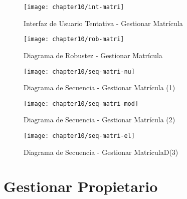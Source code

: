      \begin{figure}[H]
        \centering
        \texttt{[image: chapter10/int-matri]}
        \caption{Interfaz de Usuario Tentativa - Gestionar Matrícula}
        \label{fig:int-matri}
    \end{figure}
    
\begin{landscape}
    \begin{figure}[H]
        \centering
        \texttt{[image: chapter10/rob-matri]}
        \caption{Diagrama de Robustez - Gestionar Matrícula}
        \label{fig:rob-matri}
    \end{figure}
    \begin{figure}[H]
        \centering
        \texttt{[image: chapter10/seq-matri-nu]}
        \caption{Diagrama de Secuencia - Gestionar Matrícula (1) }
        \label{fig:seq-matri-nu}
    \end{figure}
    
    \begin{figure}[H]
        \centering
        \texttt{[image: chapter10/seq-matri-mod]}
        \caption{Diagrama de Secuencia - Gestionar Matrícula (2) }
        \label{fig:seq-matri-mo}
    \end{figure}
    
    \begin{figure}[H]
        \centering
        \texttt{[image: chapter10/seq-matri-el]}
        \caption{Diagrama de Secuencia - Gestionar MatrículaD(3) }
        \label{fig:seq-matri-el}
    \end{figure}
\end{landscape}
    
\section{Gestionar Propietario}

